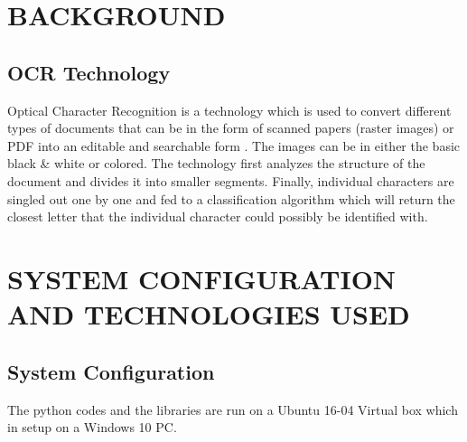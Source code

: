 \documentclass[9pt,twocolumn,twoside]{../../styles/osajnl}
\begin{document}
\section{BACKGROUND}
\subsection{OCR Technology}  
 
Optical Character Recognition is a technology which is used to convert
different types of documents that can be in the form of scanned papers
(raster images) or PDF into an editable and searchable form  \cite{www-ocr}. The
images can be in either the basic black \& white or colored.  The
technology first analyzes the structure of the document and divides it
into smaller segments. Finally, individual characters are singled out
one by one and fed to a classification algorithm which will return the
closest letter that the individual character could possibly be
identified with.

\section {SYSTEM CONFIGURATION AND TECHNOLOGIES USED}
\subsection{System Configuration}
The python codes and the libraries are run on a Ubuntu 16-04 Virtual
box which in setup on a Windows 10 PC.
\end{document}
